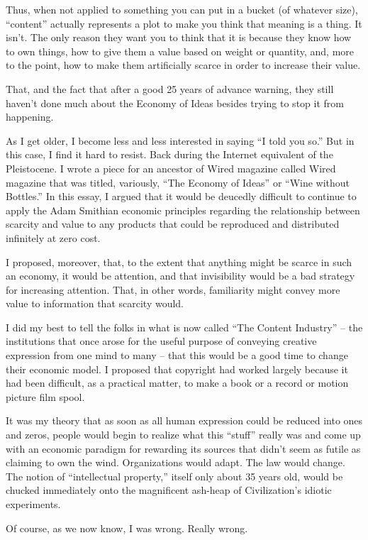 Thus, when not applied to something you can put in a bucket (of
whatever size), ``content'' actually represents a plot to make you
think that meaning is a thing. It isn't. The only reason they want
you to think that it is because they know how to own things, how to
give them a value based on weight or quantity, and, more to the
point, how to make them artificially scarce in order to increase
their value.

That, and the fact that after a good 25 years of advance warning,
they still haven't done much about the Economy of Ideas besides
trying to stop it from happening.

As I get older, I become less and less interested in saying ``I told
you so.'' But in this case, I find it hard to resist. Back during
the Internet equivalent of the Pleistocene. I wrote a piece for an
ancestor of Wired magazine called Wired magazine that was titled,
variously, ``The Economy of Ideas'' or ``Wine without Bottles.'' In
this essay, I argued that it would be deucedly difficult to
continue to apply the Adam Smithian economic principles regarding
the relationship between scarcity and value to any products that
could be reproduced and distributed infinitely at zero cost.

I proposed, moreover, that, to the extent that anything might be
scarce in such an economy, it would be attention, and that
invisibility would be a bad strategy for increasing attention.
That, in other words, familiarity might convey more value to
information that scarcity would.

I did my best to tell the folks in what is now called ``The Content
Industry'' -- the institutions that once arose for the useful purpose
of conveying creative expression from one mind to many -- that this
would be a good time to change their economic model. I proposed
that copyright had worked largely because it had been difficult, as
a practical matter, to make a book or a record or motion picture
film spool.

It was my theory that as soon as all human expression could be
reduced into ones and zeros, people would begin to realize what
this ``stuff'' really was and come up with an economic paradigm for
rewarding its sources that didn't seem as futile as claiming to own
the wind. Organizations would adapt. The law would change. The
notion of ``intellectual property,'' itself only about 35 years old,
would be chucked immediately onto the magnificent ash-heap of
Civilization's idiotic experiments.

Of course, as we now know, I was wrong. Really wrong.


